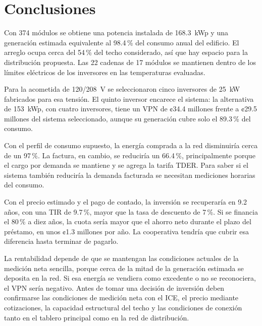 \section{Conclusiones}

Con 374 módulos se obtiene una potencia instalada de \SI{168.3}{kWp} y una generación estimada equivalente al 98.4\,\% del consumo anual del edificio. El arreglo ocupa cerca del 54\,\% del techo considerado, así que hay espacio para la distribución propuesta. Las 22 cadenas de 17 módulos se mantienen dentro de los límites eléctricos de los inversores en las temperaturas evaluadas.

Para la acometida de 120/\SI{208}{V} se seleccionaron cinco inversores de \SI{25}{kW} fabricados para esa tensión. El quinto inversor encarece el sistema: la alternativa de \SI{153}{kWp}, con cuatro inversores, tiene un VPN de ¢34.4 millones frente a ¢29.5 millones del sistema seleccionado, aunque su generación cubre solo el 89.3\,\% del consumo.

Con el perfil de consumo supuesto, la energía comprada a la red disminuiría cerca de un 97\,\%. La factura, en cambio, se reduciría un 66.4\,\%, principalmente porque el cargo por demanda se mantiene y se agrega la tarifa TDER. Para saber si el sistema también reduciría la demanda facturada se necesitan mediciones horarias del consumo.

Con el precio estimado y el pago de contado, la inversión se recuperaría en 9.2 años, con una TIR de 9.7\,\%, mayor que la tasa de descuento de 7\,\%. Si se financia el 80\,\% a diez años, la cuota sería mayor que el ahorro neto durante el plazo del préstamo, en unos ¢1.3 millones por año. La cooperativa tendría que cubrir esa diferencia hasta terminar de pagarlo.

La rentabilidad depende de que se mantengan las condiciones actuales de la medición neta sencilla, porque cerca de la mitad de la generación estimada se deposita en la red. Si esa energía se vendiera como excedente o no se reconociera, el VPN sería negativo. Antes de tomar una decisión de inversión deben confirmarse las condiciones de medición neta con el ICE, el precio mediante cotizaciones, la capacidad estructural del techo y las condiciones de conexión tanto en el tablero principal como en la red de distribución.
